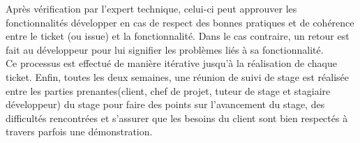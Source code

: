 		Après vérification par l’expert technique, celui-ci peut approuver les fonctionnalités développer en cas de respect des bonnes pratiques et de cohérence entre le ticket (ou issue) et la fonctionnalité. Dans le cas contraire, un retour est fait au développeur pour lui signifier les problèmes liés à sa fonctionnalité.\\
		
		Ce processus est effectué de manière itérative jusqu’à la réalisation de chaque ticket. Enfin, toutes les deux semaines, une réunion de suivi de stage est réalisée entre les parties prenantes(client, chef de projet, tuteur de stage et stagiaire développeur) du stage pour faire des points sur l’avancement du stage, des difficultés rencontrées et s’assurer que les besoins du client sont bien respectés à travers parfois une démonstration.
		
		